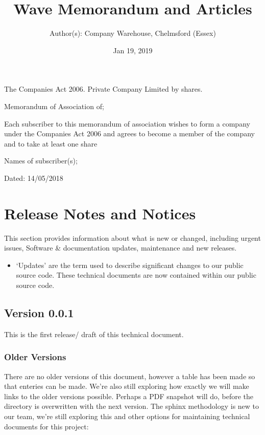 \documentclass[letterpaper,10pt,openany,oneside,english]{sphinxmanual}
\title{Wave Memorandum and Articles}
\date{Jan 19, 2019}
\author{Author(s): Company Warehouse, Chelmsford (Essex)}
\begin{document}
\maketitle
\sphinxtableofcontents
{}\label{\detokenize{index::doc}}


The Companies Act 2006. Private Company Limited by shares.

Memorandum of Association of; 

Each subscriber to this memorandum of association wishes to form a company under the Companies Act 2006 and agrees to become a member of the company and to take at least one share

Names of subscriber(s); 

Dated: 14/05/2018


\chapter{Release Notes and Notices}
\label{\detokenize{releasenotes:release-notes-and-notices}}\label{\detokenize{releasenotes::doc}}
This section provides information about what is new or changed, including urgent issues, Software \& documentation updates, maintenance and new releases.
\begin{itemize}
\item {} 
‘Updates’ are the term used to describe significant changes to our public source code. These technical documents are now contained within our public source code.

\end{itemize}


\section{Version 0.0.1}
\label{\detokenize{releasenotes:version-0-0-1}}
This is the first release/ draft of this technical document.


\subsection{Older Versions}
\label{\detokenize{releasenotes:older-versions}}
There are no older versions of this document, however a table has been made so that enteries can be made. We’re also still exploring how exactly we will make links to the older versions possible. Perhaps a PDF snapshot will do, before the directory is overwritten with the next version. The sphinx methodology is new to our team, we’re still exploring this and other options for maintaining technical documents for this project:
\end{document}
